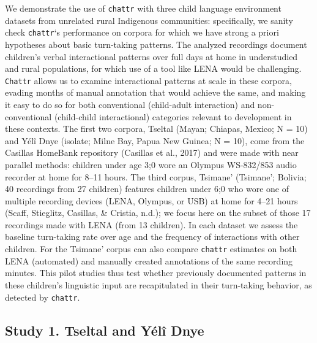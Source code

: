 \documentclass[10pt, letterpaper]{article}
\begin{document}
We demonstrate the use of \texttt{chattr} with three child language
environment datasets from unrelated rural Indigenous communities:
specifically, we sanity check \texttt{chattr}`s performance on corpora
for which we have strong a priori hypotheses about basic turn-taking
patterns. The analyzed recordings document children's verbal
interactional patterns over full days at home in understudied and rural
populations, for which use of a tool like LENA would be challenging.
\texttt{Chattr} allows us to examine interactional patterns at scale in
these corpora, evading months of manual annotation that would achieve
the same, and making it easy to do so for both conventional (child-adult
interaction) and non-conventional (child-child interactional) categories
relevant to development in these contexts. The first two corpora,
Tseltal (Mayan; Chiapas, Mexico; N = 10) and Yélî Dnye (isolate; Milne
Bay, Papua New Guinea; N = 10), come from the Casillas HomeBank
repository (Casillas et al., 2017) and were made with near parallel
methods: children under age 3;0 wore an Olympus WS-832/853 audio
recorder at home for 8--11 hours. The third corpus, Tsimane' (Tsimane';
Bolivia; 40 recordings from 27 children) features children under 6;0 who
wore one of multiple recording devices (LENA, Olympus, or USB) at home
for 4--21 hours (Scaff, Stieglitz, Casillas, \& Cristia, n.d.); we focus
here on the subset of those 17 recordings made with LENA (from 13
children). In each dataset we assess the baseline turn-taking rate over
age and the frequency of interactions with other children. For the
Tsimane' corpus can also compare \texttt{chattr} estimates on both LENA
(automated) and manually created annotations of the same recording
minutes. This pilot studies thus test whether previously documented
patterns in these children's linguistic input are recapitulated in their
turn-taking behavior, as detected by \texttt{chattr}.

\hypertarget{study-1.-tseltal-and-yuxe9luxee-dnye}{%
\subsection{Study 1. Tseltal and Yélî
Dnye}\label{study-1.-tseltal-and-yuxe9luxee-dnye}}
\end{document}
